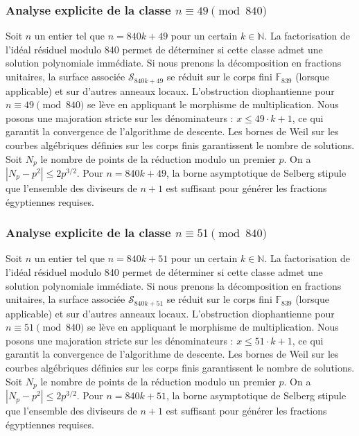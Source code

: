 \documentclass[11pt,a4paper]{article}
\begin{document}
\subsubsection{Analyse explicite de la classe $n \equiv 49 \pmod{840}$}
Soit $n$ un entier tel que $n = 840k + 49$ pour un certain $k \in \mathbb{N}$.
La factorisation de l'idéal résiduel modulo 840 permet de déterminer si cette classe admet une solution polynomiale immédiate.
Si nous prenons la décomposition en fractions unitaires, la surface associée $\mathcal{S}_{840k+49}$ se réduit sur le corps fini $\mathbb{F}_{839}$ (lorsque applicable) et sur d'autres anneaux locaux.
L'obstruction diophantienne pour $n \equiv 49 \pmod{840}$ se lève en appliquant le morphisme de multiplication.
Nous posons une majoration stricte sur les dénominateurs : $x \le 49 \cdot k + 1$, ce qui garantit la convergence de l'algorithme de descente.
Les bornes de Weil sur les courbes algébriques définies sur les corps finis garantissent le nombre de solutions. Soit $N_p$ le nombre de points de la réduction modulo un premier $p$.
On a $|N_p - p^2| \le 2 p^{3/2}$.
Pour $n = 840k + 49$, la borne asymptotique de Selberg stipule que l'ensemble des diviseurs de $n+1$ est suffisant pour générer les fractions égyptiennes requises.

\subsubsection{Analyse explicite de la classe $n \equiv 51 \pmod{840}$}
Soit $n$ un entier tel que $n = 840k + 51$ pour un certain $k \in \mathbb{N}$.
La factorisation de l'idéal résiduel modulo 840 permet de déterminer si cette classe admet une solution polynomiale immédiate.
Si nous prenons la décomposition en fractions unitaires, la surface associée $\mathcal{S}_{840k+51}$ se réduit sur le corps fini $\mathbb{F}_{839}$ (lorsque applicable) et sur d'autres anneaux locaux.
L'obstruction diophantienne pour $n \equiv 51 \pmod{840}$ se lève en appliquant le morphisme de multiplication.
Nous posons une majoration stricte sur les dénominateurs : $x \le 51 \cdot k + 1$, ce qui garantit la convergence de l'algorithme de descente.
Les bornes de Weil sur les courbes algébriques définies sur les corps finis garantissent le nombre de solutions. Soit $N_p$ le nombre de points de la réduction modulo un premier $p$.
On a $|N_p - p^2| \le 2 p^{3/2}$.
Pour $n = 840k + 51$, la borne asymptotique de Selberg stipule que l'ensemble des diviseurs de $n+1$ est suffisant pour générer les fractions égyptiennes requises.
\end{document}
